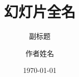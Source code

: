 \documentclass[xcolor=dvipsnames]{beamer}  %
\begin{document}
\title[幻灯片缩略名]{幻灯片全名}           %
\subtitle{副标题}
\author{作者姓名}
\date[\initclock\tdtime]{\today}                     %
\begin{frame}
	\titlepage
\end{frame}                                %

\begin{frame}                              %
	
\end{frame}                                %
\end{document}
